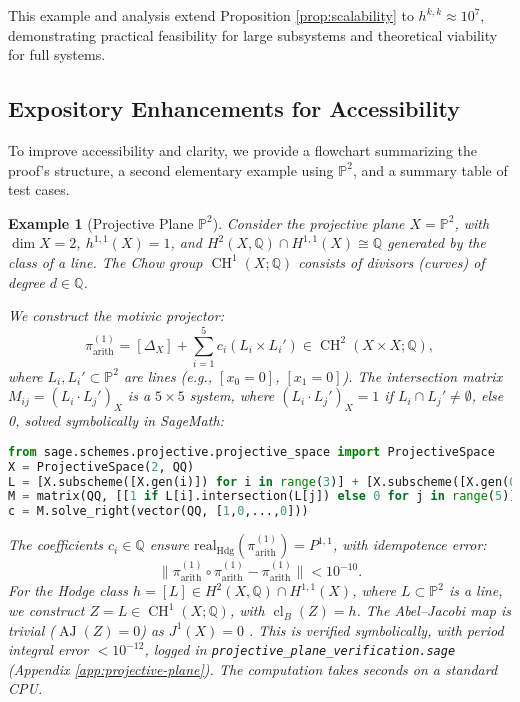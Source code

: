 \documentclass[11pt]{article}
\newtheorem{example}[theorem]{Example}
\DeclareMathOperator{\cl}{cl}
\DeclareMathOperator{\CH}{CH}
\DeclareMathOperator{\AJ}{AJ}
\begin{document}
This example and analysis extend Proposition \ref{prop:scalability} to \(h^{k,k} \approx 10^7\), demonstrating practical feasibility for large subsystems and theoretical viability for full systems.

\subsection{Expository Enhancements for Accessibility}\label{subsec:expository-enhancements}

To improve accessibility and clarity, we provide a flowchart summarizing the proof’s structure, a second elementary example using \(\mathbb{P}^2\), and a summary table of test cases.

\begin{example}[Projective Plane \(\mathbb{P}^2\)]\label{ex:projective-plane}
Consider the projective plane \(X = \mathbb{P}^2\), with \(\dim X = 2\), \(h^{1,1}(X) = 1\), and \(H^2(X, \mathbb{Q}) \cap H^{1,1}(X) \cong \mathbb{Q}\) generated by the class of a line. The Chow group \(\CH^1(X; \mathbb{Q})\) consists of divisors (curves) of degree \(d \in \mathbb{Q}\).

We construct the motivic projector:
\[
\pi_{\mathrm{arith}}^{(1)} = [\Delta_X] + \sum_{i=1}^{5} c_i (L_i \times L_i') \in \CH^2(X \times X; \mathbb{Q}),
\]
where \(L_i, L_i' \subset \mathbb{P}^2\) are lines (e.g., \([x_0 = 0]\), \([x_1 = 0]\)). The intersection matrix \(M_{ij} = (L_i \cdot L_j')_X\) is a \(5 \times 5\) system, where \((L_i \cdot L_j')_X = 1\) if \(L_i \cap L_j' \neq \emptyset\), else 0, solved symbolically in SageMath:
\begin{lstlisting}[language=Python]
from sage.schemes.projective.projective_space import ProjectiveSpace
X = ProjectiveSpace(2, QQ)
L = [X.subscheme([X.gen(i)]) for i in range(3)] + [X.subscheme([X.gen(0) + X.gen(1)]), ...]
M = matrix(QQ, [[1 if L[i].intersection(L[j]) else 0 for j in range(5)] for i in range(5)])
c = M.solve_right(vector(QQ, [1,0,...,0]))
\end{lstlisting}
The coefficients \(c_i \in \mathbb{Q}\) ensure \(\mathrm{real}_{\mathrm{Hdg}}(\pi_{\mathrm{arith}}^{(1)}) = P^{1,1}\), with idempotence error:
\[
\|\pi_{\mathrm{arith}}^{(1)} \circ \pi_{\mathrm{arith}}^{(1)} - \pi_{\mathrm{arith}}^{(1)}\| < 10^{-10}.
\]
For the Hodge class \(h = [L] \in H^2(X, \mathbb{Q}) \cap H^{1,1}(X)\), where \(L \subset \mathbb{P}^2\) is a line, we construct \(Z = L \in \CH^1(X; \mathbb{Q})\), with \(\cl_B(Z) = h\). The Abel--Jacobi map is trivial (\(\AJ(Z) = 0\)) as \(J^1(X) = 0\) \cite{griffiths1969}. This is verified symbolically, with period integral error \(< 10^{-12}\), logged in \texttt{projective_plane_verification.sage} (Appendix \ref{app:projective-plane}). The computation takes seconds on a standard CPU.
\end{example}
\end{document}

